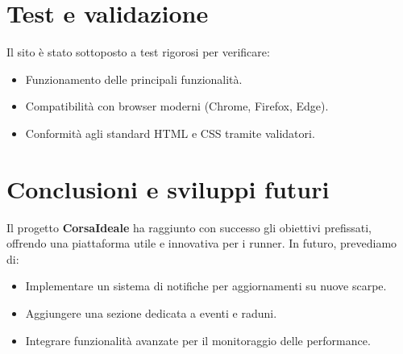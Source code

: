 \documentclass[a4paper, 12pt]{article}
\begin{document}
\begin{justify}
\section{Test e validazione}
Il sito \`e stato sottoposto a test rigorosi per verificare:
\begin{itemize}
    \item Funzionamento delle principali funzionalit\`a.
    \item Compatibilit\`a con browser moderni (Chrome, Firefox, Edge).
    \item Conformit\`a agli standard HTML e CSS tramite validatori.
\end{itemize}

\section{Conclusioni e sviluppi futuri}
Il progetto \textbf{CorsaIdeale} ha raggiunto con successo gli obiettivi prefissati, offrendo una piattaforma utile e innovativa per i runner. In futuro, prevediamo di:
\begin{itemize}
    \item Implementare un sistema di notifiche per aggiornamenti su nuove scarpe.
    \item Aggiungere una sezione dedicata a eventi e raduni.
    \item Integrare funzionalit\`a avanzate per il monitoraggio delle performance.
\end{itemize}

\vspace{1cm}


\end{justify}
\end{document}
